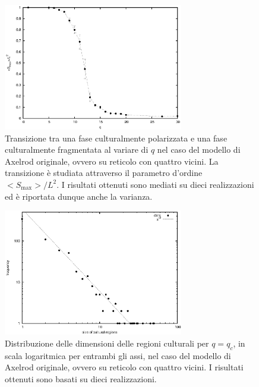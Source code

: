 \documentclass[a4paper,12pt]{article}
\begin{document}
\begin{figure}
\begin{center}
\includegraphics[width=0.7\textwidth]{transizione_ret.eps}
\end{center}
\caption{Transizione tra una fase culturalmente polarizzata e una fase culturalmente fragmentata al variare di $q$ nel caso del modello di Axelrod originale, ovvero su reticolo con quattro vicini. La transizione \`{e} studiata attraverso il parametro d'ordine $<S_{\max}>/L^2$. I risultati ottenuti sono mediati su dieci realizzazioni ed \`{e} riportata dunque anche la varianza. }
\label{transiz_ret} 
\end{figure}

\begin{figure}[!ht]
\begin{center}
\includegraphics[width=0.7\textwidth]{cum_distr_size_ret.eps}
\end{center}
\caption{Distribuzione delle dimensioni delle regioni culturali per $q = q_c$, in scala logaritmica per entrambi gli assi, nel caso del modello di Axelrod originale, ovvero su reticolo con quattro vicini. I risultati ottenuti sono basati su dieci realizzazioni.}
\label{cum_distr_size_ret}
\end{figure}
\end{document}
